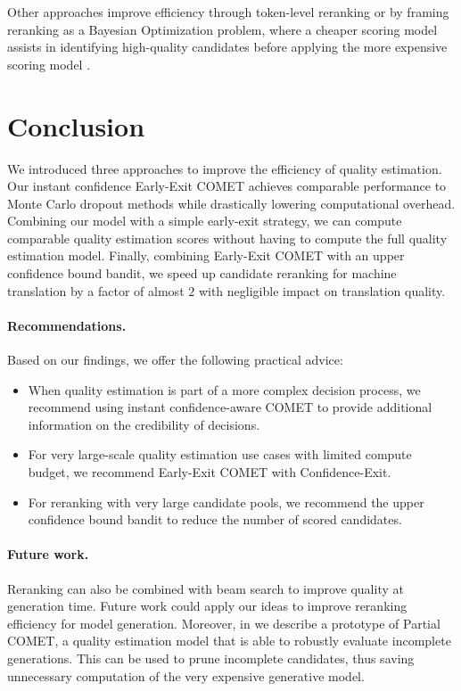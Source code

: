 Other approaches improve efficiency through token-level reranking \citep{singhal-etal-2023-eel} or by framing reranking as a Bayesian Optimization problem, where a cheaper scoring model assists in identifying high-quality candidates before applying the more expensive scoring model \citep{cheng2024bayesianoptimizationapproachmachine}.



\section{Conclusion}

We introduced three approaches to improve the efficiency of quality estimation.
Our instant confidence Early-Exit COMET achieves comparable performance to Monte Carlo dropout methods while drastically lowering computational overhead.
Combining our model with a simple early-exit strategy, we can compute comparable quality estimation scores without having to compute the full quality estimation model.
Finally, combining Early-Exit COMET with an upper confidence bound bandit, we speed up candidate reranking for machine translation by a factor of almost $2$ with negligible impact on translation quality.

\paragraph{Recommendations.}
Based on our findings, we offer the following practical advice:
\begin{itemize}[topsep=0mm]
\item When quality estimation is part of a more complex decision process, we recommend using instant confidence-aware COMET to provide additional information on the credibility of decisions.
\item For very large-scale quality estimation use cases with limited compute budget, we recommend Early-Exit COMET with Confidence-Exit.
\item For reranking with very large candidate pools, we recommend the upper confidence bound bandit to reduce the number of scored candidates.
\end{itemize}



\paragraph{Future work.}
Reranking can also be combined with beam search to improve quality at generation time. Future work could apply our ideas to improve reranking efficiency for model generation. 
Moreover, in  we describe a prototype of Partial COMET, a quality estimation model that is able to robustly evaluate incomplete generations.
This can be used to prune incomplete candidates, thus saving unnecessary computation of the very expensive generative model.



